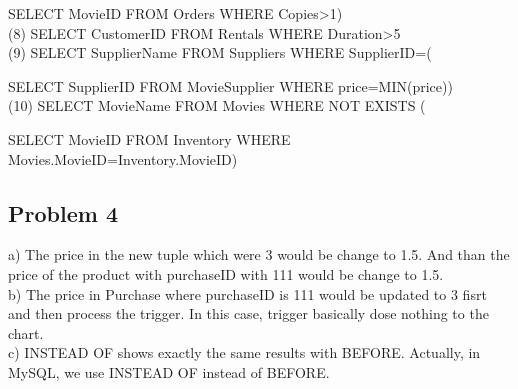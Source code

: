 \documentclass{article}
\begin{document}
        SELECT MovieID FROM Orders WHERE Copies>1)\\
    (8) SELECT CustomerID FROM Rentals WHERE Duration>5\\

    (9) SELECT SupplierName FROM Suppliers WHERE SupplierID=(
        
        SELECT SupplierID FROM MovieSupplier WHERE price=MIN(price))\\
    (10) SELECT MovieName FROM Movies WHERE NOT EXISTS (
        
        SELECT MovieID FROM Inventory WHERE Movies.MovieID=Inventory.MovieID)
    
    \subsection*{Problem 4}
    a) The price in the new tuple which were 3 would be change to 1.5. And than the price of the product with purchaseID with 111 would be change to 1.5.\\
    b) The price in Purchase where purchaseID is 111 would be updated to 3 fisrt and then process the trigger. In this case, trigger basically dose nothing to the chart.\\
    c) INSTEAD OF shows exactly the same results with BEFORE. Actually, in MySQL, we use INSTEAD OF instead of BEFORE.
\end{document}
